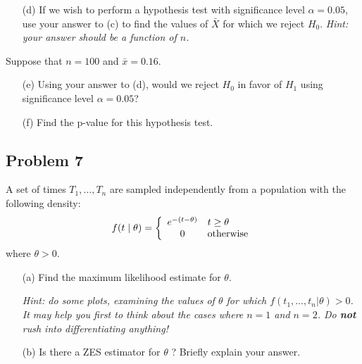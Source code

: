 \documentclass{article}
\newcommand{\1}{\mathbf{1}}
\begin{document}
\begin{itemize}
    \item[(d)]  If we wish to perform a hypothesis test with significance level $\alpha = 0.05$, use your answer to (c) to find the values of $\bar{X}$ for which we reject $H_0$. {\it Hint: your answer should be a function of $n$.}
    
    
    
\end{itemize}
Suppose that $n=100$ and $\bar{x}=0.16$. 
\begin{itemize}
    \item[(e)] Using your answer to (d), would we reject $H_0$ in favor of $H_1$ using significance level $\alpha=0.05$?
    \item[(f)] Find the p-value for this hypothesis test.
\end{itemize}


\newpage
\subsection*{Problem 7}
A set of  times $T_1,\ldots ,T_n$ are sampled independently from a population with the following density:
$$f(t \mid \theta)  = \left\{\begin{array}{cl}
    e^{-(t-\theta)} & t \geq \theta \\
    0 & \hbox{otherwise}
    \end{array}\right.
$$
where $\theta >0$. \par
\begin{itemize}
    \item[(a)] Find the maximum likelihood estimate for $\theta$.\par
    {\it Hint: do some plots, examining the values of $\theta$ for which $f(t_1,\ldots,t_n|\theta)>0$. It may help you first to think about the cases where $n=1$ and $n=2$.  Do {\bf not}  rush into differentiating anything!}
    \item[(b)] Is there a ZES estimator for $\theta$ ? Briefly explain your answer.
\end{itemize}

\end{document}
